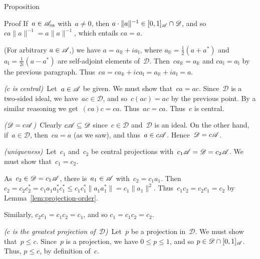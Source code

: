 \documentclass[a]{subfiles}
\begin{document}
\begin{parsec}
\begin{point}{Proposition}
\begin{point}{Proof}
If~$a\in \mathscr{A}_{\mathrm{sa}}$
with~$a\neq 0$,
then $a\cdot\|a\|^{-1} \in [0,1]_{\mathscr{A}}\cap \mathscr{D}$,
and so $ca \|a\|^{-1} = a \|a\|^{-1}$,
which entails $ca = a$.

(For arbitrary $a\in \mathscr{A}$,)
we have $a= a_{\mathbb{R}} + i a_{\mathbb{I}}$,
where $a_\mathbb{R}=\frac{1}{2}(a+a^*)$
and $a_\mathbb{I} = \frac{1}{2i}(a-a^*)$
are self-adjoint elements of~$\mathscr{D}$.
Then~$ca_\mathbb{R}=a_\mathbb{R}$
and $ca_\mathbb{I}=a_\mathbb{I}$
by the previous paragraph.
Thus~$ca=ca_\mathbb{R}+ica_\mathbb{I}=a_\mathbb{R}+ia_\mathbb{I}=a$.

\emph{($c$ is central)}\ 
Let~$a\in\mathscr{A}$ be given.
We must show that~$ca=ac$.
Since~$\mathscr{D}$ is a two-sided ideal,
we have~$ac\in \mathscr{D}$,
and so~$c(ac)=ac$ by the previous point.
By a similar reasoning we get~$(ca)c=ca$.
Thus~$ac=ca$.
Thus~$c$ is central.

\emph{($\mathscr{D} = c\mathscr{A}$)}\ 
Clearly $c\mathscr{A}\subseteq\mathscr{D}$
since~$c\in\mathscr{D}$ and~$\mathscr{D}$ is an ideal.
On the other hand,
if~$a\in\mathscr{D}$,
then~$ca=a$
(as we saw),
and thus~$a\in c\mathscr{A}$.
Hence~$\mathscr{D} = c\mathscr{A}$.

\emph{(uniqueness)}\ 
Let~$c_1$ and~$c_2$ be central projections 
with~$c_1\mathscr{A} = \mathscr{D}=c_2\mathscr{A}$.
We must show that~$c_1=c_2$.

As~$c_2\in\mathscr{D}=c_1 \mathscr{A}$,
there is~$a_1\in \mathscr{A}$
with~$c_2 = c_1a_1$.
Then~$c_2 = c_2c_2^* = c_1a_1a_1^*c_1^*\leq 
c_1c_1^*\|a_1a_1^*\|=c_1\|a_1\|^2$.
Thus~$c_1c_2=c_2c_1=c_2$ by Lemma~\ref{lem:projection-order}.

Similarly, $c_2c_1 = c_1c_2 = c_1$, and so $c_1=c_1c_2=c_2$.

\emph{($c$ is the greatest projection of~$\mathscr{D}$)}\ 
Let~$p$ be a projection in~$\mathscr{D}$.
We must show that~$p\leq c$.
Since~$p$ is a projection,
we have $0\leq p\leq 1$, and so $p\in \mathscr{D}\cap [0,1]_{\mathscr{A}}$.
Thus, $p\leq c$, by definition of~$c$.
\end{point}
\end{point}
\end{parsec}
\end{document}

